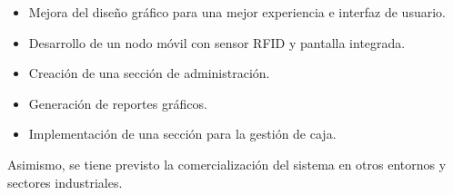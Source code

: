 \begin{itemize}
\item Mejora del diseño gráfico para una mejor experiencia e interfaz de usuario.
\item Desarrollo de un nodo móvil con sensor RFID y pantalla integrada.
\item Creación de una sección de administración.
\item Generación de reportes gráficos.
\item Implementación de una sección para la gestión de caja.
\end{itemize}

Asimismo, se tiene previsto la comercialización del sistema en otros entornos y sectores industriales.